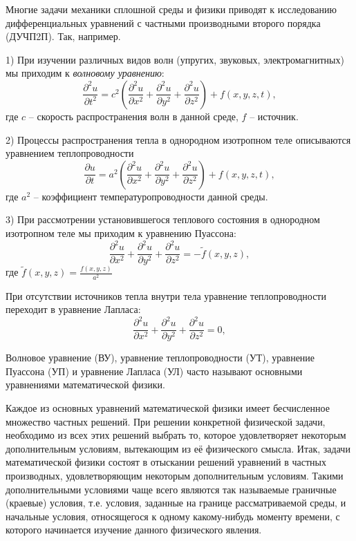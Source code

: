 Многие задачи механики сплошной среды и физики приводят к исследованию дифференциальных уравнений с частными производными второго порядка (ДУЧП2П). Так, например.

1) При изучении различных видов волн (упругих, звуковых, электромагнитных) мы приходим к \textsl{волновому уравнению}:
\[
\frac{\partial^2 u}{\partial t^2} = c^2 \left( \frac{\partial^2 u}{\partial x^2} + \frac{\partial^2 u}{\partial y^2} + \frac{\partial^2 u}{\partial z^2} \right) + f(x, y, z, t),
\]
где $c$ -- скорость распространения волн в данной среде, $f$ -- источник.

2) Процессы распространения тепла в однородном изотропном теле описываются уравнением теплопроводности
\[
\frac{\partial u}{\partial t} = a^2 \left( \frac{\partial^2 u}{\partial x^2} + \frac{\partial^2 u}{\partial y^2} + \frac{\partial^2 u}{\partial z^2} \right) + f(x, y, z, t),
\]
где $a^2$ – коэффициент температуропроводности данной среды.

3) При рассмотрении установившегося теплового состояния в однородном изотропном теле мы приходим к уравнению Пуассона:
\[
	\frac{\partial^2 u}{\partial x^2} + \frac{\partial^2 u}{\partial y^2} + \frac{\partial^2 u}{\partial z^2} = -\tilde{f}(x, y, z),
\]
где $\tilde{f}(x, y, z) = \frac{f(x, y, z)}{a^2}$

При отсутствии источников тепла внутри тела уравнение теплопроводности переходит в уравнение Лапласа:
\[
	\frac{\partial^2 u}{\partial x^2} + \frac{\partial^2 u}{\partial y^2} + \frac{\partial^2 u}{\partial z^2} = 0,
\]

Волновое уравнение (ВУ), уравнение теплопроводности (УТ), уравнение Пуассона (УП) и уравнение Лапласа (УЛ) часто называют основными уравнениями математической физики.

\bigskip

Каждое из основных уравнений математической физики имеет бесчисленное множество частных решений. При решении конкретной физической задачи, необходимо из всех этих решений выбрать то, которое удовлетворяет некоторым дополнительным условиям, вытекающим из её физического смысла. Итак, задачи математической физики состоят в отыскании решений уравнений в частных производных, удовлетворяющим некоторым дополнительным условиям. Такими дополнительными условиями чаще всего являются так называемые граничные (краевые) условия, т.е. условия, заданные на границе рассматриваемой среды, и начальные условия, относящегося к одному какому-нибудь моменту времени, с которого начинается изучение данного физического явления.

